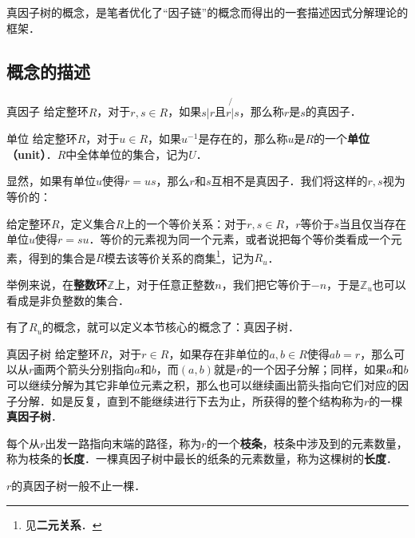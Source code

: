 

真因子树的概念，是笔者优化了“因子链”的概念而得出的一套描述因式分解理论的框架．

\subsection{概念的描述}

\begin{definition}{真因子}
给定整环$R$，对于$r, s\in R$，如果$s|r$且$r\not{|}s$，那么称$r$是$s$的真因子．
\end{definition}

\begin{definition}{单位}
给定整环$R$，对于$u\in R$，如果$u^{-1}$是存在的，那么称$u$是$R$的一个\textbf{单位（unit）}．$R$中全体单位的集合，记为$U$．
\end{definition}

显然，如果有单位$u$使得$r=us$，那么$r$和$s$互相不是真因子．我们将这样的$r, s$视为等价的：

\begin{definition}{}
给定整环$R$，定义集合$R$上的一个等价关系：对于$r, s\in R$，$r$等价于$s$当且仅当存在单位$u$使得$r=su$．等价的元素视为同一个元素，或者说把每个等价类看成一个元素，得到的集合是$R$模去该等价关系的商集\footnote{见\textbf{二元关系}．}，记为$R_u$．
\end{definition}

举例来说，在\textbf{整数环}$\mathbb{Z}$上，对于任意正整数$n$，我们把它等价于$-n$，于是$\mathbb{Z}_u$也可以看成是非负整数的集合．

有了$R_u$的概念，就可以定义本节核心的概念了：真因子树．

\begin{definition}{真因子树}
给定整环$R$，对于$r\in R$，如果存在非单位的$a, b\in R$使得$ab=r$，那么可以从$r$画两个箭头分别指向$a$和$b$，而$(a, b)$就是$r$的一个因子分解；同样，如果$a$和$b$可以继续分解为其它非单位元素之积，那么也可以继续画出箭头指向它们对应的因子分解．如是反复，直到不能继续进行下去为止，所获得的整个结构称为$r$的一棵\textbf{真因子树}．

每个从$r$出发一路指向末端的路径，称为$r$的一个\textbf{枝条}，枝条中涉及到的元素数量，称为枝条的\textbf{长度}．一棵真因子树中最长的纸条的元素数量，称为这棵树的\textbf{长度}．

$r$的真因子树一般不止一棵．
\end{definition}

